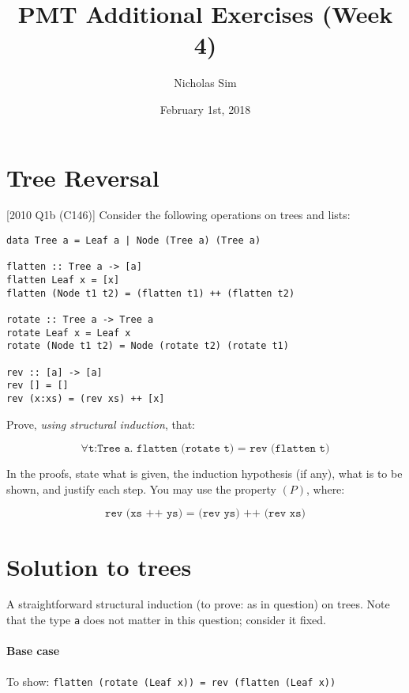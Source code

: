 \documentclass[10pt,a4paper]{article}
\begin{document}
\title{PMT Additional Exercises (Week 4)}
\author{Nicholas Sim}
\date{February 1st, 2018}
\maketitle{}


\section{Tree Reversal}
[2010 Q1b (C146)] Consider the following operations on trees and lists:

\begin{lstlisting}
data Tree a = Leaf a | Node (Tree a) (Tree a)

flatten :: Tree a -> [a]
flatten Leaf x = [x]
flatten (Node t1 t2) = (flatten t1) ++ (flatten t2)

rotate :: Tree a -> Tree a
rotate Leaf x = Leaf x
rotate (Node t1 t2) = Node (rotate t2) (rotate t1)

rev :: [a] -> [a]
rev [] = []
rev (x:xs) = (rev xs) ++ [x]
\end{lstlisting}

Prove, \emph{using structural induction}, that:

\[ \forall \texttt{t:Tree a. flatten (rotate t) = rev (flatten t)} \]

In the proofs, state what is given, the induction hypothesis (if any), 
what is to be shown, and justify each step.
You may use the property \((P)\), where:

\[ \texttt{rev (xs ++ ys) = (rev ys) ++ (rev xs)} \]


\newpage

\section{Solution to trees}
A straightforward structural induction (to prove: as in question) on trees.
Note that the type \texttt{a} does not matter in this question; consider it fixed.

\paragraph{Base case}
To show: \texttt{flatten (rotate (Leaf x)) = rev (flatten (Leaf x))}
\end{document}
